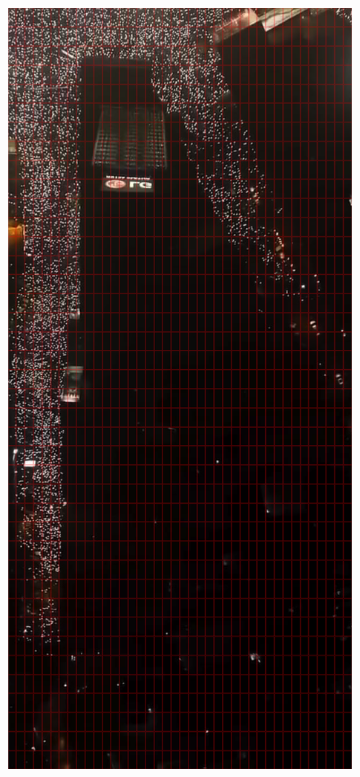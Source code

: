 \documentclass[a4paper,12pt]{article}
\begin{document}
\begin{figure}[H]
	\begin{subfigure}[b]{0.3\textwidth}
	  \centering
	  \includegraphics[width=\textwidth]{../outputs/grid_output/makenzijeva_grid.png}

\end{subfigure}
\end{figure}
\end{document}
